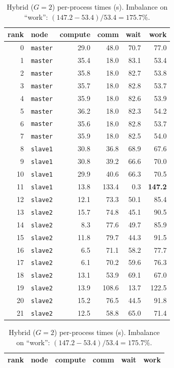 \documentclass[11pt,a4paper]{article}
\newcommand{\code}[1]{\texttt{#1}}
\begin{document}
\begin{table}[H]
\centering\scriptsize
\caption{Hybrid ($G=2$) per-process times (s). Imbalance on ``work'':
$(147.2-53.4)/53.4=175.7\%$.}\label{tab:raw-hybrid}
\begin{tabular}{@{}rlrrrr@{}}
\toprule
rank & node & compute & comm & wait & work \\ \midrule
0 & \code{master} & 29.0 & 48.0 & 70.7 & 77.0 \\
1 & \code{master} & 35.4 & 18.0 & 83.1 & 53.4 \\
2 & \code{master} & 35.8 & 18.0 & 82.7 & 53.8 \\
3 & \code{master} & 35.7 & 18.0 & 82.8 & 53.7 \\
4 & \code{master} & 35.9 & 18.0 & 82.6 & 53.9 \\
5 & \code{master} & 36.2 & 18.0 & 82.3 & 54.2 \\
6 & \code{master} & 35.6 & 18.0 & 82.8 & 53.7 \\
7 & \code{master} & 35.9 & 18.0 & 82.5 & 54.0 \\
8 & \code{slave1} & 30.8 & 36.8 & 68.9 & 67.6 \\
9 & \code{slave1} & 30.8 & 39.2 & 66.6 & 70.0 \\
10 & \code{slave1} & 29.9 & 40.6 & 66.3 & 70.5 \\
11 & \code{slave1} & 13.8 & 133.4 & 0.3 & \textbf{147.2} \\
12 & \code{slave2} & 12.1 & 73.3 & 50.1 & 85.4 \\
13 & \code{slave2} & 15.7 & 74.8 & 45.1 & 90.5 \\
14 & \code{slave2} & 8.3 & 77.6 & 49.7 & 85.9 \\
15 & \code{slave2} & 11.8 & 79.7 & 44.3 & 91.5 \\
16 & \code{slave2} & 6.5 & 71.1 & 58.2 & 77.7 \\
17 & \code{slave2} & 6.1 & 70.2 & 59.6 & 76.3 \\
18 & \code{slave2} & 13.1 & 53.9 & 69.1 & 67.0 \\
19 & \code{slave2} & 13.9 & 108.6 & 13.7 & 122.5 \\
20 & \code{slave2} & 15.2 & 76.5 & 44.5 & 91.8 \\
21 & \code{slave2} & 12.5 & 58.8 & 65.0 & 71.4 \\
\bottomrule
\end{tabular}
\quad
\begin{tabular}{@{}rlrrrr@{}}
\toprule
rank & node & compute & comm & wait & work \\ \midrule

\end{tabular}
\end{table}
\end{document}

